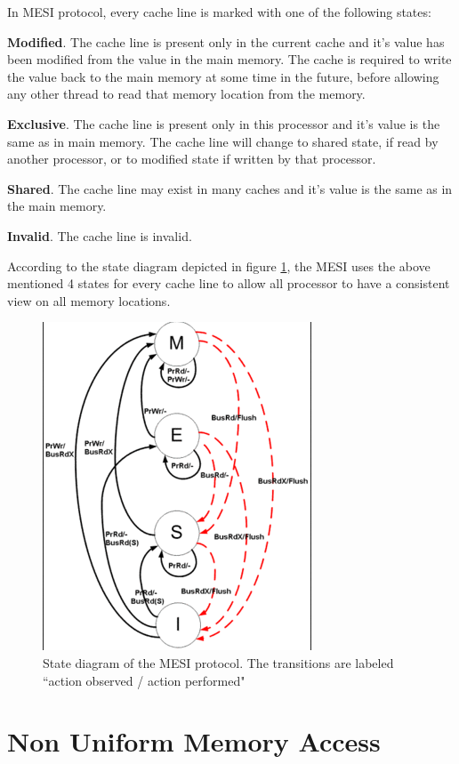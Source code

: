 In MESI protocol, every cache line is marked with one of the following states:

\textbf{Modified}. The cache line is present only in the current cache and it's value has been modified from the value in the main memory. The cache is required to write the value back to the main memory at some time in the future, before allowing any other thread to read that memory location from the memory.

\textbf{Exclusive}. The cache line is present only in this processor and it's value is the same as in main memory. The cache line will change to shared state, if read by another processor, or to modified state if written by that processor.

\textbf{Shared}. The cache line may exist in many caches and it's value is the same as in the main memory.

\textbf{Invalid}. The cache line is invalid.

According to the state diagram depicted in figure \ref{mesi_protocol}, the MESI uses the above mentioned 4 states for every cache line to allow all processor to have a consistent view on all memory locations.

\begin{figure} 
 \centering 
  \includegraphics[scale=0.7]{mesi_protocol.png} 
\caption{State diagram of the MESI protocol. The transitions are labeled “action observed / action performed"} 
\label{mesi_protocol} 
\end{figure} 

\section{Non Uniform Memory Access}

